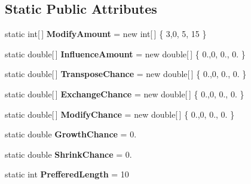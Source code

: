 \subsection*{Static Public Attributes}
\begin{DoxyCompactItemize}
\item 
\hypertarget{class_music_population_1_1_member1_a86549329af1e5727450170dd02427441}{static int\mbox{[}$\,$\mbox{]} {\bfseries Modify\+Amount} = new int\mbox{[}$\,$\mbox{]} \{ 3,0, 5, 15 \}}\label{class_music_population_1_1_member1_a86549329af1e5727450170dd02427441}

\item 
\hypertarget{class_music_population_1_1_member1_a0002f60dd91b2de9928db76cc8c451ac}{static double\mbox{[}$\,$\mbox{]} {\bfseries Influence\+Amount} = new double\mbox{[}$\,$\mbox{]} \{ 0.,0, 0., 0. \}}\label{class_music_population_1_1_member1_a0002f60dd91b2de9928db76cc8c451ac}

\item 
\hypertarget{class_music_population_1_1_member1_a4e7afb22ea6cb2153113540c781e176d}{static double\mbox{[}$\,$\mbox{]} {\bfseries Transpose\+Chance} = new double\mbox{[}$\,$\mbox{]} \{ 0.,0, 0., 0. \}}\label{class_music_population_1_1_member1_a4e7afb22ea6cb2153113540c781e176d}

\item 
\hypertarget{class_music_population_1_1_member1_a996d5b04fb45c0618b2683fb726a285b}{static double\mbox{[}$\,$\mbox{]} {\bfseries Exchange\+Chance} = new double\mbox{[}$\,$\mbox{]} \{ 0.,0, 0., 0. \}}\label{class_music_population_1_1_member1_a996d5b04fb45c0618b2683fb726a285b}

\item 
\hypertarget{class_music_population_1_1_member1_add664b4e7a4a867d45aaae94d27835d3}{static double\mbox{[}$\,$\mbox{]} {\bfseries Modify\+Chance} = new double\mbox{[}$\,$\mbox{]} \{ 0.,0, 0., 0. \}}\label{class_music_population_1_1_member1_add664b4e7a4a867d45aaae94d27835d3}

\item 
\hypertarget{class_music_population_1_1_member1_a3c82666179e1b0b0974c6feef16814b6}{static double {\bfseries Growth\+Chance} = 0.}\label{class_music_population_1_1_member1_a3c82666179e1b0b0974c6feef16814b6}

\item 
\hypertarget{class_music_population_1_1_member1_a7dfdefc75909d42031ec64873954024c}{static double {\bfseries Shrink\+Chance} = 0.}\label{class_music_population_1_1_member1_a7dfdefc75909d42031ec64873954024c}

\item 
\hypertarget{class_music_population_1_1_member1_a11ccb48eebb833e95132a3fe2bd6b22b}{static int {\bfseries Preffered\+Length} = 10}\label{class_music_population_1_1_member1_a11ccb48eebb833e95132a3fe2bd6b22b}

\end{DoxyCompactItemize}
